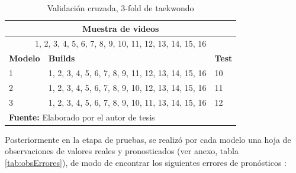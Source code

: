 \begin{table}[H]
\begin{center}
\caption{Validaci\'on cruzada, 3-fold de taekwondo}
\label{tab:KfoldTaekwondo}
\begin{tabular}{|l|l|l|}
\hline
\multicolumn{3}{|c|}{\textbf{Muestra de videos}} \\ \hline
\multicolumn{3}{|c|}{1, 2, 3, 4, 5, 6, 7, 8, 9, 10, 11, 12, 13, 14, 15, 16} \\ \hline
\textbf{Modelo} & \textbf{Builds} & \textbf{Test} \\ \hline
1 & 1, 2, 3, 4, 5, 6, 7, 8, 9, 11, 12, 13, 14, 15, 16 & 10 \\ \hline
2 & 1, 2, 3, 4, 5, 6, 7, 8, 9, 10, 12, 13, 14, 15, 16 & 11 \\ \hline
3 & 1, 2, 3, 4, 5, 6, 7, 8, 9, 10, 11, 13, 14, 15, 16 & 12 \\ \hline
\multicolumn{3}{l}{\textbf{Fuente:} Elaborado por el autor de tesis}
\end{tabular}
\end{center}
\end{table}
Posteriormente en la etapa de pruebas, se realiz\'o  por cada modelo una hoja de observaciones de valores reales y pronosticados (ver anexo, tabla \ref{tab:obsErrores}), de modo de encontrar los siguientes errores de pron\'osticos \cite{erroresPronostico}:
